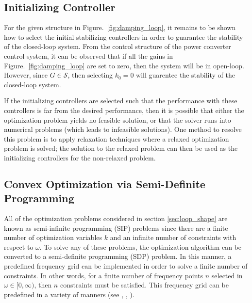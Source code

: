 \documentclass[a4paper, 10pt, conference]{ieeeconf}
\begin{document}
\subsection{Initializing Controller}
For the given structure in Figure.~\ref{fig:damping_loop}, it remains to be shown how to select the initial stabilizing controllers in order to guarantee the stability of the closed-loop system. From the control structure of the power converter control system, it can be observed that if all the gains in Figure.~\ref{fig:damping_loop} are set to zero, then the system will be in open-loop. However, since $G \in \mathscr{S}$, then selecting $k_0 = 0$ will guarentee the stability of the closed-loop system. 

If the initializing controllers are selected such that the performance with these controllers is far from the desired performance, then it is possible that either the optimization problem yields no feasible solution, or that the solver runs into numerical problems (which leads to infeasible solutions). One method to resolve this problem is to apply relaxation techniques where a relaxed optimization problem is solved; the solution to the relaxed problem can then be used as the initializing controllers for the non-relaxed problem. 


\subsection{Convex Optimization via Semi-Definite Programming}
All of the optimization problems considered in section \ref{sec:loop_shape} are known as semi-infinite programming (SIP) problems since there are a finite number of optimization variables $k$ and an infinite number of constraints with respect to $\omega$. To solve any of these problems, the optimization algorithm can be converted to a semi-definite programming (SDP) problem. In this manner, a predefined frequency grid can be implemented in order to solve a finite number of constraints. In other words, for a finite number of frequency points $n$ selected in $\omega \in [0,\infty)$, then $n$ constraints must be satisfied. This frequency grid can be predefined in a variety of manners (see \cite{GKL10b}, \cite{SVBB11}, \cite{FR05}). 
\end{document}
